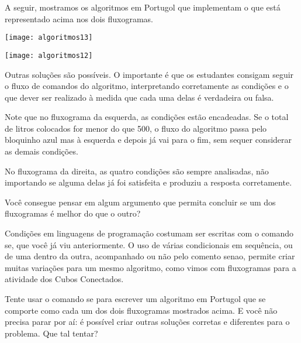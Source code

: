 \begin{texto}
{
A seguir, mostramos os algoritmos em Portugol que implementam o que está representado acima nos dois fluxogramas.

\centering
\texttt{[image: algoritmos13]}

\texttt{[image: algoritmos12]}
\justify

Outras soluções são possíveis. O importante é que os estudantes consigam seguir o fluxo de comandos do algoritmo, interpretando corretamente as condições e o que dever ser realizado à medida que cada uma delas é verdadeira ou falsa.
}
\end{texto}

Note que no fluxograma da esquerda, as condições estão encadeadas. Se o total de litros colocados for menor do que 500, o fluxo do algoritmo passa pelo bloquinho azul mas à esquerda e depois já vai para o fim, sem sequer considerar as demais condições.

No fluxograma da direita, as quatro condições são sempre analisadas, não importando se alguma delas já foi satisfeita e produziu a resposta corretamente.



\begin{reflection}
Você consegue pensar em algum argumento que permita concluir se um dos fluxogramas é melhor do que o outro?
\end{reflection}



\label{comp-know2}

Condições em linguagens de programação costumam ser escritas com o comando se, que você já viu anteriormente. O uso de várias condicionais em sequência, ou de uma dentro da outra, acompanhado ou não pelo comento senao, permite criar muitas variações para um mesmo algoritmo, como vimos com fluxogramas para a atividade dos Cubos Conectados.

Tente usar o comando se para escrever um algoritmo em Portugol que se comporte como cada um dos dois fluxogramas mostrados acima. E você não precisa parar por aí: é possível criar outras soluções corretas e diferentes para o problema. Que tal tentar?


